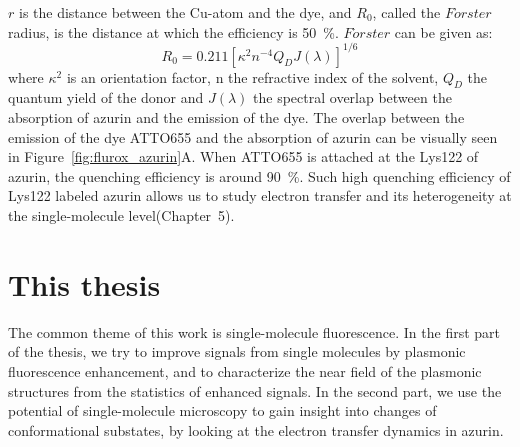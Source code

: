 $r$ is the distance between the Cu-atom and the dye, and $R_0$, called the $F\ddot{o}rster$ radius, is the distance at which the efficiency is \SI{50}{\percent}. 
$F\ddot{o}rster$ can be given as:
\begin{equation}
	R_0 = 0.211[\kappa^2n^{-4}Q_DJ(\lambda)]^{1/6}	
\end{equation}
where $\kappa^2$ is an orientation factor, n the refractive index of the solvent, $Q_D$ the quantum yield of the donor and $J(\lambda)$ the spectral overlap between the absorption of azurin and the emission of the dye.
The overlap between the emission of the dye ATTO655 and the absorption of azurin can be visually seen in Figure~\ref{fig:flurox_azurin}A.
When ATTO655 is attached at the Lys122 of azurin, the quenching efficiency is around \SI{90}{\percent}.
Such high quenching efficiency of Lys122 labeled azurin allows us to study electron transfer and its heterogeneity at the single-molecule level(Chapter~5).

\section{This thesis}
The common theme of this work is single-molecule fluorescence. In the first part of the thesis, we try to improve signals from single molecules by plasmonic fluorescence enhancement, and to characterize the near field of the plasmonic structures from the statistics of enhanced signals. In the second part, we use the potential of single-molecule microscopy to gain insight into changes of conformational substates, by looking at the electron transfer dynamics in azurin.

